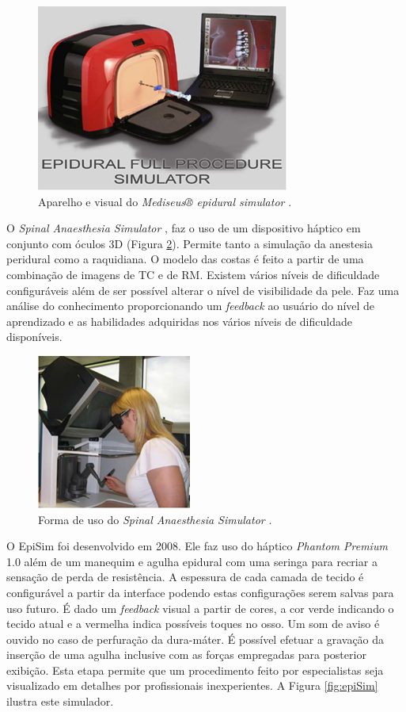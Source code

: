 \begin{figure}[ht!]
    \centering
    \includegraphics[width=0.6\linewidth]{capitulos/figuras/mediseusSimulator.png} 
    \caption{Aparelho e visual do \textit{Mediseus® epidural simulator}  \cite{Mayooran2006}.}
    \label{fig:mediseusSimulator}
\end{figure}

O \textit{Spinal Anaesthesia Simulator} \cite{Albert2007,Dreifaldt2006}, faz o uso de um dispositivo háptico em conjunto com óculos 3D (Figura \ref{fig:spinalAnestesiaSim}). Permite tanto a simulação da anestesia peridural como a raquidiana. O modelo das costas é feito a partir de uma combinação de imagens de \acrfull{TC} e de \acrshort{RM}. Existem vários níveis de dificuldade configuráveis além de ser possível alterar o nível de visibilidade da pele. Faz uma análise do conhecimento proporcionando um \textit{feedback} ao usuário do nível de aprendizado e as habilidades adquiridas nos vários níveis de dificuldade disponíveis.

\begin{figure}[ht!]
    \centering
    \includegraphics[width=0.3\linewidth]{capitulos/figuras/spinalAnestesiaSim.png} 
    \caption{Forma de uso do \textit{Spinal Anaesthesia Simulator}  \cite{Dreifaldt2006}.}
    \label{fig:spinalAnestesiaSim}
\end{figure}

O EpiSim \cite{YantricInc2011} foi desenvolvido em 2008. Ele faz uso do háptico \textit{Phantom Premium} 1.0 além de um manequim e agulha epidural com uma seringa para recriar a sensação de perda de resistência. A espessura de cada camada de tecido é configurável a partir da interface podendo estas configurações serem salvas para uso futuro. É dado um \textit{feedback} visual a partir de cores, a cor verde indicando o tecido atual e a vermelha indica possíveis toques no osso. Um som de aviso é ouvido no caso de perfuração da dura-máter. É possível efetuar a gravação da inserção de uma agulha inclusive com as forças empregadas para posterior exibição. Esta etapa permite que um procedimento feito por especialistas seja visualizado em detalhes por profissionais inexperientes. A Figura \ref{fig:epiSim} ilustra este simulador.

